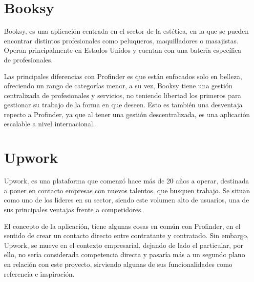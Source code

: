 \section{Booksy}
Booksy\hyperlink{cap:biblio}{}, es una aplicación centrada en el sector de la estética, en la que se pueden encontrar distintos profesionales como peluqueros, maquilladores o masajistas. Operan principalmente en Estados Unidos y cuentan con una batería específica de profesionales.

Las principales diferencias con Profinder es que están enfocados solo en belleza, ofreciendo un rango de categorías menor, a su vez, Booksy tiene una gestión centralizada de profesionales y servicios, no teniendo libertad los primeros para gestionar su trabajo de la forma en que deseen. Esto es también una desventaja repecto a Profinder, ya que al tener una gestión descentralizada, es una aplicación escalable a nivel internacional. 
\section{Upwork}

Upwork\hyperlink{cap:biblio}{}, es una plataforma que comenzó hace más de 20 años a operar, destinada a poner en contacto empresas con nuevos talentos, que busquen trabajo. Se situan como uno de los líderes en su sector, siendo este volumen alto de usuarios, una de sus principales ventajas frente a competidores.

El concepto de la aplicación, tiene algunas cosas en común con Profinder, en el sentido de crear un contacto directo entre contratante y contratado. Sin embargo, Upwork, se mueve en el contexto empresarial, dejando de lado el particular, por ello, no sería considerada competencia directa y pasaría más a un segundo plano en relación con este proyecto, sirviendo algunas de sus funcionalidades como referencia e inspiración.







